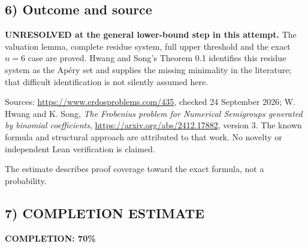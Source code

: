 \subsection*{6) Outcome and source}
\textbf{UNRESOLVED at the general lower-bound step in this attempt.} The valuation lemma, complete residue system, full upper threshold and the exact $n=6$ case are proved. Hwang and Song's Theorem 0.1 identifies this residue system as the Ap\'ery set and supplies the missing minimality in the literature; that difficult identification is not silently assumed here.

Sources: \url{https://www.erdosproblems.com/435}, checked 24 September 2026; W. Hwang and K. Song, \emph{The Frobenius problem for Numerical Semigroups generated by binomial coefficients}, \url{https://arxiv.org/abs/2412.17882}, version 3. The known formula and structural approach are attributed to that work. No novelty or independent Lean verification is claimed.

The estimate describes proof coverage toward the exact formula, not a probability.
\subsection*{7) COMPLETION ESTIMATE}
\textbf{COMPLETION: 70\%}
